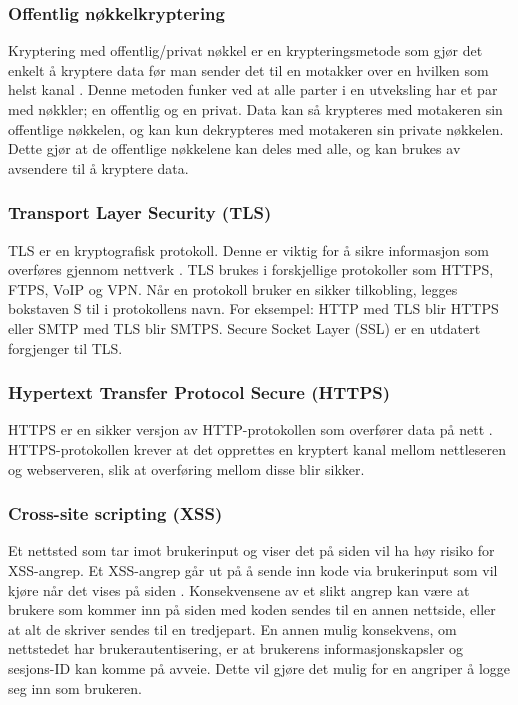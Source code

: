 \subsubsection{Offentlig nøkkelkryptering}
\label{sec:analysis-security-public_key-cryptography}
Kryptering med offentlig/privat nøkkel er en krypteringsmetode som gjør det enkelt å kryptere data før man sender det til en motakker over en hvilken som helst kanal \cite[s.~58-60]{NattTomHeine2015Datasikkerhet}. Denne metoden funker ved at alle parter i en utveksling har et par med nøkkler; en offentlig og en privat. Data kan så krypteres med motakeren sin offentlige nøkkelen, og kan kun dekrypteres med motakeren sin private nøkkelen. Dette gjør at de offentlige nøkkelene kan deles med alle, og kan brukes av avsendere til å kryptere data.
 
\subsubsection{Transport Layer Security (TLS)}
\label{sec:analysis-security-tls}
TLS er en kryptografisk protokoll. Denne er viktig for å sikre informasjon som overføres gjennom nettverk \cite{thomas2000ssl}. TLS brukes i forskjellige protokoller som HTTPS, FTPS, VoIP og VPN.
Når en protokoll bruker en sikker tilkobling, legges bokstaven S til i protokollens navn. For eksempel: HTTP med TLS blir HTTPS eller SMTP med TLS blir SMTPS.
Secure Socket Layer (SSL) er en utdatert forgjenger til TLS.
 
\subsubsection{Hypertext Transfer Protocol Secure (HTTPS)}
\label{sec:analysis-security-https}
HTTPS er en sikker versjon av HTTP-protokollen som overfører data på nett \cite{rfc26161999hypertext}. HTTPS-protokollen krever at det opprettes en kryptert kanal mellom nettleseren og webserveren, slik at overføring mellom disse blir sikker.

\subsubsection{Cross-site scripting (XSS)}
\label{sec:analysis-security-xss}
Et nettsted som tar imot brukerinput og viser det på siden vil ha høy risiko for XSS-angrep.
Et XSS-angrep går ut på å sende inn kode via brukerinput som vil kjøre når det vises på siden \cite[s.~179-183]{NattTomHeine2015Datasikkerhet}. Konsekvensene av et slikt angrep kan være at brukere som kommer inn på siden med koden sendes til en annen nettside, eller at alt de skriver sendes til en tredjepart. En annen mulig konsekvens, om nettstedet har brukerautentisering, er at brukerens informasjonskapsler og sesjons-ID kan komme på avveie. Dette vil gjøre det mulig for en angriper å logge seg inn som brukeren.

